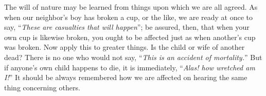 The will of nature may be learned from things upon which we are all
agreed. As when our neighbor's boy has broken a cup, or the like, we are
ready at once to say, ``\emph{These are casualties that will happen}''; be
assured, then, that when your own cup is likewise broken, you ought to be
affected just as when another's cup was broken. Now apply this to greater
things. Is the child or wife of another dead? There is no one who would
not say, ``\emph{This is an accident of mortality.}'' But if anyone's own child
happens to die, it is immediately, ``\emph{Alas! how wretched am I!}'' It should
be always remembered how we are affected on hearing the same thing 
concerning others.
